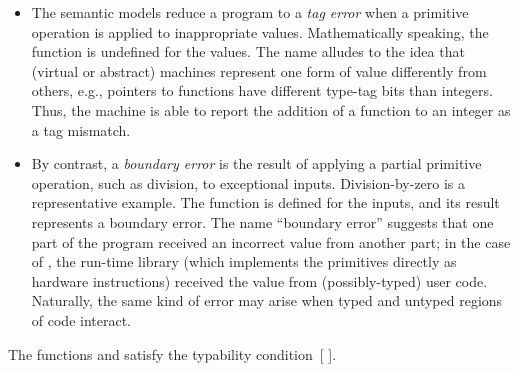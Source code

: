 \documentclass[screen=true, 10pt, acmsmall]{acmart}
\newlength{\stabLeft}
\newcommand{\atItemizeStart}[0]{\addtolength{\stabLeft}{\labelsep}
                                \addtolength{\stabLeft}{\labelwidth}}
\newcommand{\AutobibLink}[1]{\color{ACMPurple}{#1}}
\newcommand{\Autobibref}[1]{#1}
\providecommand{\AutobibLink}[1]{#1}
\begin{document}
\noindent \begin{itemize}\atItemizeStart

\item The semantic models reduce a program to a \textit{tag error} when a
primitive operation is applied to inappropriate values.  Mathematically
speaking, the \relax{$\delta$} function is undefined for the values. The name
alludes to the idea that (virtual or abstract) machines represent one form of
value differently from others, e.g., pointers to functions have different
type{-}tag bits than integers.  Thus, the machine is able to report the addition of a
function to an integer as a tag mismatch.

\item By contrast, a \textit{boundary error} is the result of applying a
partial primitive operation, such as division, to exceptional inputs.
Division{-}by{-}zero is a representative example.
The \relax{$\delta$} function is defined for the inputs,
and its result represents a boundary error.
The name {``}boundary error{''} suggests that one part of the program received
an incorrect value from another part; in the case of \relax{$\delta$}, the
run{-}time library (which implements the primitives directly as
hardware instructions) received the value from (possibly{-}typed) user code.
Naturally, the same kind of error may arise when typed and untyped regions of code interact.\end{itemize}

\noindent \relax{\noindent}The functions \relax{$\Delta$} and \relax{$\delta$} satisfy the
 typability condition\Autobibref{~[\hyperref[t:x28autobib_x22Andrew_Kx2e_Wright_and_Matthias_FelleisenA_Syntactic_Approach_to_Type_SoundnessInformation_and_Computationx2c_ppx2e_38x2dx2d941994x22x29]{\AutobibLink{Wright and Felleisen}} \hyperref[t:x28autobib_x22Andrew_Kx2e_Wright_and_Matthias_FelleisenA_Syntactic_Approach_to_Type_SoundnessInformation_and_Computationx2c_ppx2e_38x2dx2d941994x22x29]{\AutobibLink{1994}}]}.
\end{document}
